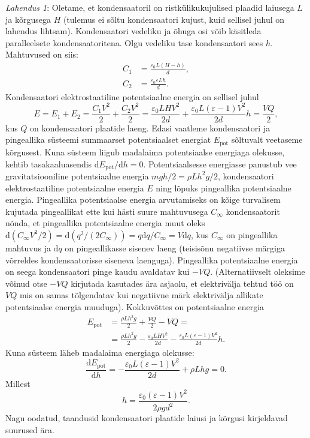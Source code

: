 \hint

\solu
\textit{Lahendus 1}:
Oletame, et kondensaatoril on ristkülikukujulised plaadid laiusega $L$ ja kõrgusega $H$ (tulemus ei sõltu kondensaatori kujust, kuid sellisel juhul on lahendus lihtsam). Kondensaatori vedeliku ja õhuga osi võib käsitleda paralleelsete kondensaatoritena. Olgu vedeliku tase kondensaatori sees $h$. Mahtuvused on siis:
\begin{align*}
C_1 &= \frac{\varepsilon_0 L (H-h)}{d},\\
C_2 &= \frac{\varepsilon_0 \varepsilon L h}{d}.
\end{align*}
Kondensaatori elektrostaatiline potentsiaalne energia on sellisel juhul $$E = E_1 + E_2 = \frac{C_ 1 V^2}{2} + \frac{C_ 2 V^2}{2} = \frac{\varepsilon_0 L H V^2}{2d} + \frac{\varepsilon_0 L (\varepsilon - 1) V^2}{2d}h = \frac{VQ}{2},$$
kus $Q$ on kondensaatori plaatide laeng. Edasi vaatleme kondensaatori ja pingeallika süsteemi summaarset potentsiaalset energiat $E_\mathrm{pot}$ sõltuvalt veetaseme kõrgusest. Kuna süsteem liigub madalaima potentsiaalse energiaga olekusse, kehtib tasakaaluasendis $\mathrm{d} E_\mathrm{pot} / \mathrm{d}h = 0$. Potentsiaalsesse energiasse panustub vee gravitatsiooniline potentsiaalne energia $mgh/2 = \rho L h^2 g/2$, kondensaatori elektrostaatiline potentsiaalne energia $E$ ning lõpuks pingeallika potentsiaalne energia. Pingeallika potentsiaalse energia arvutamiseks on kõige turvalisem kujutada pingeallikat ette kui hästi suure mahtuvusega $C_\infty$ kondensaatorit nõnda, et pingeallika potentsiaalne energia muut oleks $\mathrm{d}(C_\infty V^2/2) = \mathrm{d}(q^2/(2C_\infty)) = q\mathrm{d}q/C_\infty = V\mathrm{d}q$, kus $C_\infty$ on pingeallika mahtuvus ja $\mathrm{d}q$ on pingeallikasse sisenev laeng (teisisõnu negatiivse märgiga võrreldes kondensaatorisse siseneva laenguga). Pingeallika potentsiaalne energia on seega kondensaatori pinge kaudu avaldatav kui $-VQ$. (Alternatiivselt oleksime võinud otse $-VQ$ kirjutada kasutades ära asjaolu, et elektrivälja tehtud töö on $VQ$ mis on samas tõlgendatav kui negatiivne märk elektrivälja allikate potentsiaalse energia muuduga). Kokkuvõttes on potentsiaalne energia
\begin{align*}
E_\mathrm{pot} &=  \frac{\rho L h^2 g}{2} + \frac{VQ}{2} - VQ =\\
&=\frac{\rho L h^2 g}{2} -\frac{\varepsilon_0 L H V^2}{2d} - \frac{\varepsilon_0 L (\varepsilon - 1) V^2}{2d}h.
\end{align*}
Kuna süsteem läheb madalaima energiaga olekusse:
\[
\frac{\mathrm{d}E_\mathrm{pot}}{\mathrm{d}h} = -\frac{\varepsilon_0 L (\varepsilon - 1) V^2}{2d} + \rho L h g = 0.
\]
Millest
\[
  h = \frac{\varepsilon_0 (\varepsilon - 1) V^2}{2 \rho g d^2}.
\]
Nagu oodatud, taandusid kondensaatori plaatide laiusi ja kõrgusi kirjeldavad suurused ära.


